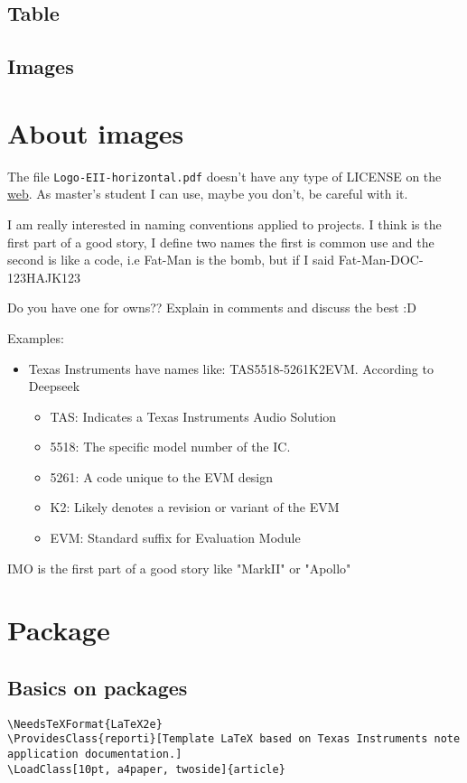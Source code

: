 \documentclass{reporti}
\begin{document}
\subsection{Table}
\label{sec:orgab6ea81}

\subsection{Images}
\label{sec:orgc3633fe}


\section{About images}
\label{sec:orgbadd380}
The file \texttt{Logo-EII-horizontal.pdf} doesn't have any type of LICENSE on the \href{https://www.uma.es/escuela-de-ingenierias-industriales/info/108566/logo-simbolo-de-la-eii/}{web}. As master's student I can use, maybe you don't, be careful with it.

I am really interested in naming conventions applied to projects. I think is the first part of a good story, I define two names the first is common use and the second is like a code, i.e Fat-Man is the bomb, but if I said Fat-Man-DOC-123HAJK123

Do you have one for owns?? Explain in comments and discuss the best :D

Examples:
\begin{itemize}
\item Texas Instruments have names like: TAS5518-5261K2EVM. According to Deepseek
\begin{itemize}
\item TAS: Indicates a Texas Instruments Audio Solution
\item 5518: The specific model number of the IC.
\item 5261: A code unique to the EVM design
\item K2: Likely denotes a revision or variant of the EVM
\item EVM: Standard suffix for Evaluation Module
\end{itemize}
\end{itemize}

IMO is the first part of a good story like "MarkII" or "Apollo"

\section{Package}
\label{sec:org51ee1d8}
\subsection{Basics on packages}
\label{sec:orgf2f585d}
\begin{verbatim}
\NeedsTeXFormat{LaTeX2e}
\ProvidesClass{reporti}[Template LaTeX based on Texas Instruments note application documentation.]
\LoadClass[10pt, a4paper, twoside]{article}
\end{verbatim}
\end{document}
